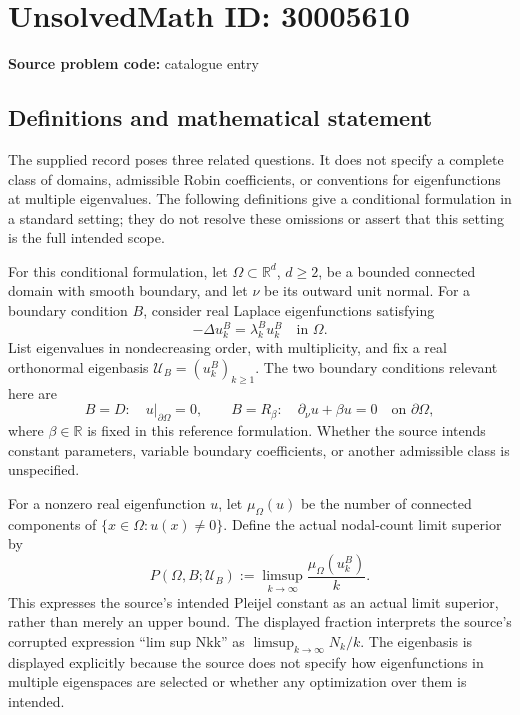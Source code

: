 \documentclass[11pt]{article}
\newcommand{\R}{\mathbb{R}}
\begin{document}
\section*{UnsolvedMath ID: 30005610}
\textbf{Source problem code:} catalogue entry
\subsection{Definitions and mathematical statement}
The supplied record poses three related questions. It does not specify a complete class of domains, admissible Robin coefficients, or conventions for eigenfunctions at multiple eigenvalues. The following definitions give a conditional formulation in a standard setting; they do not resolve these omissions or assert that this setting is the full intended scope.

For this conditional formulation, let \(\Omega\subset\R^d\), \(d\geq2\), be a bounded connected domain with smooth boundary, and let \(\nu\) be its outward unit normal. For a boundary condition \(B\), consider real Laplace eigenfunctions satisfying
\[
-\Delta u_k^B=\lambda_k^B u_k^B\quad\text{in }\Omega.
\]
List eigenvalues in nondecreasing order, with multiplicity, and fix a real orthonormal eigenbasis \(\mathcal U_B=(u_k^B)_{k\geq1}\). The two boundary conditions relevant here are
\[
B=D:\quad u|_{\partial\Omega}=0,
\qquad
B=R_\beta:\quad \partial_\nu u+\beta u=0
\quad\text{on }\partial\Omega,
\]
where \(\beta\in\R\) is fixed in this reference formulation. Whether the source intends constant parameters, variable boundary coefficients, or another admissible class is unspecified.

For a nonzero real eigenfunction \(u\), let \(\mu_\Omega(u)\) be the number of connected components of
\(\{x\in\Omega:u(x)\ne0\}\). Define the actual nodal-count limit superior by
\[
P(\Omega,B;\mathcal U_B)
:=\limsup_{k\to\infty}\frac{\mu_\Omega(u_k^B)}{k}.
\]
This expresses the source's intended Pleijel constant as an actual limit superior, rather than merely an upper bound. The displayed fraction interprets the source's corrupted expression ``lim sup Nkk'' as \(\limsup_{k\to\infty}N_k/k\). The eigenbasis is displayed explicitly because the source does not specify how eigenfunctions in multiple eigenspaces are selected or whether any optimization over them is intended.
\end{document}
